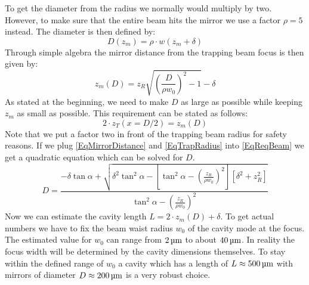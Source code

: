 To get the diameter from the radius we normally would multiply by two. However, to make sure that the entire beam hits the mirror we use a factor $\rho = 5$ instead. The diameter is then defined by:
\begin{equation}\label{BeamDiameter}
	D(z_{\si{m}})=\rho\cdot w(z_{\si{m}}+\delta)
\end{equation}
Through simple algebra the mirror distance from the trapping beam focus is then given by:
\begin{equation}\label{EqMirrorDistance}
	z_{\si{m}}(D)=z_{\si{R}}\sqrt{\left(\frac{D}{\rho w_0}\right)^2-1}-\delta
\end{equation}
As stated at the beginning, we need to make $D$ as large as possible while keeping $z_{\si{m}}$ as small as possible. This requirement can be stated as follows:
\begin{equation}\label{EqReqBeam}
	2\cdot z_{\si{T}}(x=D/2)=z_{\si{m}}(D)
\end{equation}
Note that we put a factor two in front of the trapping beam radius for safety reasons. If we plug \autoref{EqMirrorDistance} and \autoref{EqTrapRadius} into \autoref{EqReqBeam} we get a quadratic equation which can be solved for $D$.
\begin{equation}
	D=\frac{-\delta\tan\alpha+\sqrt{\delta^2\tan^2\alpha -\left[\tan^2\alpha-\left(\frac{z_{\si{R}}}{\rho w_0}\right)^2\right]\left[\delta^2+z_{\si{R}}^2\right]}}{\tan^2\alpha-\left(\frac{z_{\si{R}}}{\rho w_0}\right)^2}
\end{equation}
Now we can estimate the cavity length $L=2\cdot z_{\si{m}}(D)+\delta$. To get actual numbers we have to fix the beam waist radius $w_0$ of the cavity mode at the focus. The estimated value for $w_0$ can range from $2\um$ to about $40\um$. In reality the focus width will be determined by the cavity dimensions themselves. To stay within the defined range of $w_0$ a cavity which has a length of $L\approx 500\um$ with mirrors of diameter $D\approx 200\um$ is a very robust choice.

